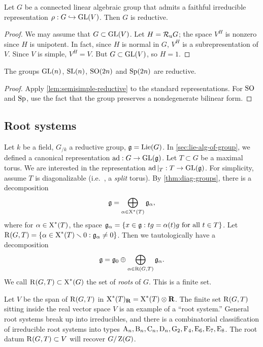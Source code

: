 \begin{lemma}\label{lem:semisimple-reductive}
Let $G$ be a connected linear algebraic group that admits a faithful 
irreducible representation $\rho:G\hookrightarrow \operatorname{GL}(V)$. Then $G$ is reductive. 
\end{lemma}
\begin{proof}
We may assume that $G\subset \operatorname{GL}(V)$. Let $H=\mathcal{R}_\mathrm{u} G$; the space $V^H$ is 
nonzero since $H$ is unipotent. In fact, since $H$ is normal in $G$, 
$V^H$ is a subrepresentation of $V$. Since $V$ is simple, $V^H=V$. But 
$G\subset \operatorname{GL}(V)$, so $H=1$. 
\end{proof}

\begin{corollary}
The groups $\operatorname{GL}(n)$, $\operatorname{SL}(n)$, $\operatorname{SO}(2n)$ and $\operatorname{Sp}(2n)$ are reductive. 
\end{corollary}
\begin{proof}
Apply \autoref{lem:semisimple-reductive} to the standard representations. For 
$\operatorname{SO}$ and $\operatorname{Sp}$, use the fact that the group preserves a nondegenerate bilinear 
form. 
\end{proof}





\subsection{Root systems}

Let $k$ be a field, $G_{/k}$ a reductive group, $\mathfrak{g}=\operatorname{Lie}(G)$. In 
\autoref{sec:lie-alg-of-group}, we defined a canonical representation 
$\operatorname{ad}:G\to \operatorname{GL}(\mathfrak{g})$. Let $T\subset G$ be a maximal torus. We are 
interested in the representation $\operatorname{ad}|_T:T\to \operatorname{GL}(\mathfrak{g})$. For simplicity, 
assume $T$ is diagonalizable (i.e.~, a \emph{split} torus). By 
\autoref{thm:diag-groups}, there is a decomposition 
\[
  \mathfrak{g} = \bigoplus_{\alpha\in\operatorname{X}^\ast(T)} \mathfrak{g}_\alpha ,
\]
where for $\alpha\in \operatorname{X}^\ast(T)$, the space 
$\mathfrak{g}_\alpha=\{x\in \mathfrak{g}:t g=\alpha(t) g\text{ for all }t\in T\}$. Let 
$\operatorname{R}(G,T) = \{\alpha\in \operatorname{X}^\ast(T)\smallsetminus 0:\mathfrak{g}_\alpha\ne 0\}$. 
Then we tautologically have a decomposition 
\[
  \mathfrak{g}=\mathfrak{g}_0\oplus \bigoplus_{\alpha\in \operatorname{R}(G,T)} \mathfrak{g}_\alpha .
\]
We call $\operatorname{R}(G,T)\subset \operatorname{X}^\ast(G)$ the set of \emph{roots} of 
$G$. This is a finite set. 

Let $V$ be the span of $\operatorname{R}(G,T)$ in 
$\operatorname{X}^\ast(T)_{\mathbf{R}}=\operatorname{X}^\ast(T)\otimes\mathbf{R}$. The finite set 
$\operatorname{R}(G,T)$ sitting inside the real vector space $V$ is an example of a 
``root system.'' General root systems break up into irreducibles, and there is 
a combinatorial classification of irreducible root systems into 
types 
$\mathrm{A}_n,\mathrm{B}_n,\mathrm{C}_n,\mathrm{D}_n,\mathrm{G}_2,\mathrm{F}_4,\mathrm{E}_6,\mathrm{E}_7,\mathrm{E}_8$. 
The root datum $\operatorname{R}(G,T)\subset V$ will recover $G/\operatorname{Z}(G)$. 





